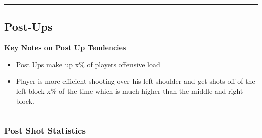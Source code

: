 \documentclass[a4paper,12pt]{article}
\begin{document}
\vspace{-1em} %
\hrule height 1pt width 1\textwidth %
\vspace{1em} %

\clearpage

\subsection{Post-Ups}

\vspace{1.25em} %
\textbf{Key Notes on Post Up Tendencies}
\vspace{0.5em} %

\begin{itemize}
    \item Post Ups make up x\% of players offensive load
    \vspace{0.3em} %
    \item Player is more efficient shooting over his left shoulder and get shots off of the left block x\% of the time which is much higher than the middle and right block.
\end{itemize}

\vspace{1em} %
\hrule height 1pt width 1\textwidth %
\vspace{0em} %

\subsubsection{Post Shot Statistics}
\end{document}
